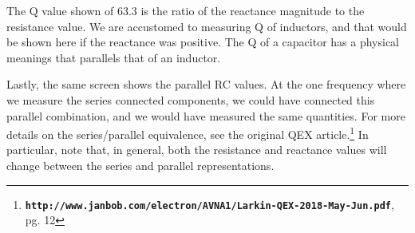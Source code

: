 The Q value shown of 63.3 is the ratio of the reactance magnitude to the resistance value.  We are accustomed to measuring Q of inductors, and that would be shown here if the reactance was positive.  The Q of a capacitor has a physical meanings that parallels that of an inductor.

Lastly, the same screen shows the parallel RC values. At the one frequency where we measure the series connected components, we could have connected this parallel combination, and we would have measured the same quantities.
For more details on the series/parallel equivalence, see the original QEX article.\footnote{\textbf{\texttt{http://www.janbob.com/electron/AVNA1/Larkin-QEX-2018-May-Jun.pdf}}, pg. 12}
%
In particular, note that, in general, both the resistance and reactance values will change between the series and parallel representations.


